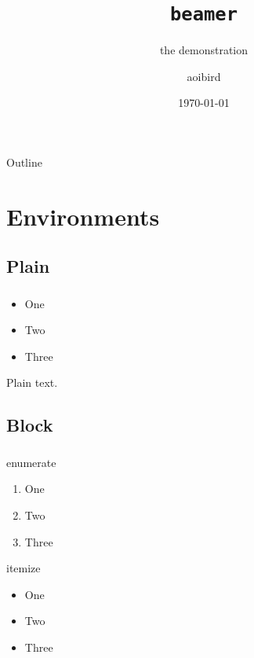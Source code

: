 \documentclass{beamer}
\title{\texttt{beamer}}
\subtitle{the demonstration}
\author{aoibird}
\date{\today}
\begin{document}
\frame{\titlepage}              %


\begin{frame}{Outline}
  \tableofcontents
\end{frame}

\section{Environments}

\subsection{Plain}
\begin{frame}
  \frametitle{\insertsubsectionhead}
  \begin{itemize}
  \item One
  \item Two
  \item Three
  \end{itemize}
  Plain text.
\end{frame}

\subsection{Block}
\begin{frame}[allowframebreaks]
  \frametitle{\insertsubsectionhead}
  \begin{block}{enumerate}
    \begin{enumerate}
    \item One
    \item Two
    \item Three
    \end{enumerate}
  \end{block}
  \framebreak
  \begin{block}{itemize}
    \begin{itemize}
    \item One
    \item Two
    \item Three
    \end{itemize}
  \end{block}
\end{frame}
\end{document}
